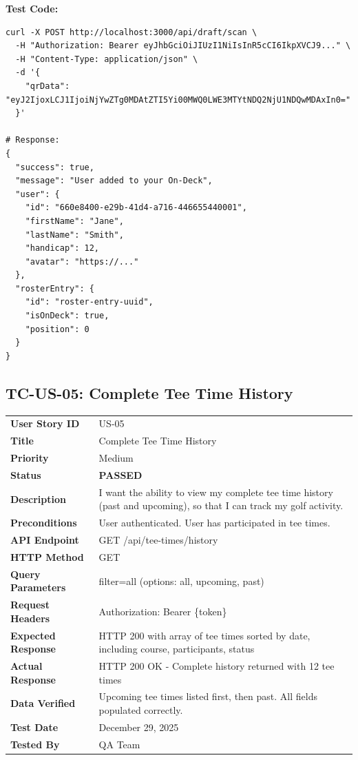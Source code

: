 \documentclass[11pt,a4paper]{article}
\newcommand{\passed}{\textcolor{pass}{\textbf{PASSED}}}
\begin{document}
\vspace{0.3cm}
\textbf{Test Code:}
\begin{lstlisting}
curl -X POST http://localhost:3000/api/draft/scan \
  -H "Authorization: Bearer eyJhbGciOiJIUzI1NiIsInR5cCI6IkpXVCJ9..." \
  -H "Content-Type: application/json" \
  -d '{
    "qrData": "eyJ2IjoxLCJ1IjoiNjYwZTg0MDAtZTI5Yi00MWQ0LWE3MTYtNDQ2NjU1NDQwMDAxIn0="
  }'

# Response:
{
  "success": true,
  "message": "User added to your On-Deck",
  "user": {
    "id": "660e8400-e29b-41d4-a716-446655440001",
    "firstName": "Jane",
    "lastName": "Smith",
    "handicap": 12,
    "avatar": "https://..."
  },
  "rosterEntry": {
    "id": "roster-entry-uuid",
    "isOnDeck": true,
    "position": 0
  }
}
\end{lstlisting}

\vspace{0.5cm}


\subsection{TC-US-05: Complete Tee Time History}

\begin{tabularx}{\textwidth}{|p{3.2cm}|Y|}
\hline
{}
 \\
\hline
\textbf{User Story ID} & US-05 \\
\hline
\textbf{Title} & Complete Tee Time History \\
\hline
\textbf{Priority} & Medium \\
\hline
\textbf{Status} & \passed \\
\hline
\textbf{Description} & I want the ability to view my complete tee time history (past and upcoming), so that I can track my golf activity. \\
\hline
\textbf{Preconditions} & User authenticated. User has participated in tee times. \\
\hline
\textbf{API Endpoint} & GET /api/tee-times/history \\
\hline
\textbf{HTTP Method} & GET \\
\hline
\textbf{Query Parameters} & filter=all (options: all, upcoming, past) \\
\hline
\textbf{Request Headers} & Authorization: Bearer \{token\} \\
\hline
\textbf{Expected Response} & HTTP 200 with array of tee times sorted by date, including course, participants, status \\
\hline
\textbf{Actual Response} & HTTP 200 OK - Complete history returned with 12 tee times \\
\hline
\textbf{Data Verified} & Upcoming tee times listed first, then past. All fields populated correctly. \\
\hline
\textbf{Test Date} & December 29, 2025 \\
\hline
\textbf{Tested By} & QA Team \\
\hline
\end{tabularx}
\end{document}
